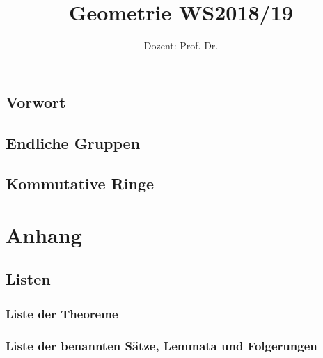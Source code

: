 \documentclass[ngerman,a4paper,order=firstname]{../../texmf/tex/latex/mathscript/mathscript}
\title{\textbf{Geometrie WS2018/19}}
\author{Dozent: Prof. Dr. \person{Arno Fehm}}
\begin{document}
\pagestyle{plain}

\maketitle

\hypertarget{tocpage}{}
\tableofcontents
{}

\pagebreak
{}
\pagestyle{fancy}

\chapter*{Vorwort}


\chapter{Endliche Gruppen}











\chapter{Kommutative Ringe}











\part*{Anhang}
\appendix

\chapter{Listen}
\section{Liste der Theoreme}

\pagebreak
\section{Liste der benannten Sätze, Lemmata und Folgerungen}


\printindex
\end{document}
